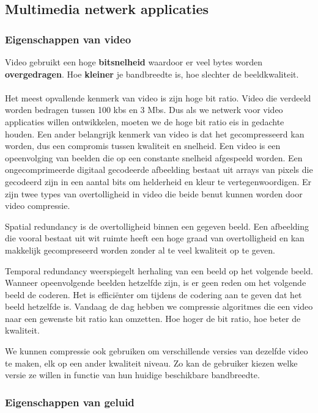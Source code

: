 \subsection{Multimedia netwerk applicaties}

\subsubsection{Eigenschappen van video}

Video gebruikt een hoge \textbf{bitsnelheid} waardoor er veel bytes worden \textbf{overgedragen}. Hoe \textbf{kleiner} je bandbreedte is, hoe slechter de beeldkwaliteit.\\\\

Het meest opvallende kenmerk van video is zijn hoge bit ratio. Video die verdeeld worden bedragen tussen 100 kbs en 3 Mbs. Dus als we netwerk voor video applicaties willen ontwikkelen, moeten we de hoge bit ratio eis in gedachte houden. Een ander belangrijk kenmerk van video is dat het gecompresseerd kan worden, dus een compromis tussen kwaliteit en snelheid. Een video is een opeenvolging van beelden die op een constante snelheid afgespeeld worden. Een ongecomprimeerde digitaal gecodeerde afbeelding bestaat uit arrays van pixels die gecodeerd zijn in een aantal bits om helderheid en kleur te vertegenwoordigen. Er zijn twee types van overtolligheid in video die beide benut kunnen worden door video compressie.

Spatial redundancy is de overtolligheid binnen een gegeven beeld. Een afbeelding die vooral bestaat uit wit ruimte heeft een hoge graad van overtolligheid en kan makkelijk gecompreseerd worden zonder al te veel kwaliteit op te geven.

Temporal redundancy weerspiegelt herhaling van een beeld op het volgende beeld. Wanneer opeenvolgende beelden hetzelfde zijn, is er geen reden om het volgende beeld de coderen. Het is efficiënter om tijdens de codering aan te geven dat het beeld hetzelfde is.
Vandaag de dag hebben we compressie algoritmes die een video naar een gewenste bit ratio kan omzetten. Hoe hoger de bit ratio, hoe beter de kwaliteit.

We kunnen compressie ook gebruiken om verschillende versies van dezelfde video te maken, elk op een ander kwaliteit niveau. Zo kan de gebruiker kiezen welke versie ze willen in functie van hun huidige beschikbare bandbreedte.

\clearpage

\subsubsection{Eigenschappen van geluid}

